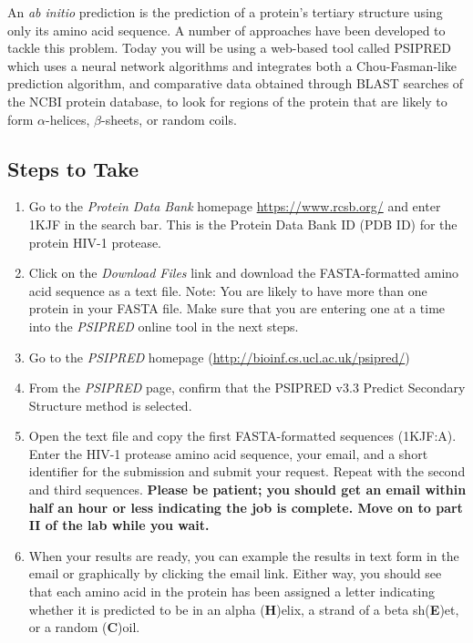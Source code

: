 An \emph{ab initio} prediction is the prediction of a protein's tertiary structure using only its amino acid sequence. A number of approaches have been developed to tackle this problem.  Today you will be using a web-based tool called PSIPRED which uses a neural network algorithms and integrates both a Chou-Fasman-like prediction algorithm, and comparative data obtained through BLAST searches of the NCBI protein database, to look for regions of the protein that are likely to form $\alpha$-helices, $\beta$-sheets, or random coils.

\subsection*{Steps to Take}

\begin{enumerate}

 \item Go to the \emph{Protein Data Bank} homepage \url{https://www.rcsb.org/} and enter \color{blue} 1KJF \color{black} in the search bar.  This is the Protein Data Bank ID (PDB ID) for the protein HIV-1 protease.

 \item Click on the \emph{Download Files} link and download the FASTA-formatted amino acid sequence as a text file. Note: You are likely to have more than one protein in your FASTA file. Make sure that you are entering one at a time into the \emph{PSIPRED} online tool in the next steps.

 \item Go to the \emph{PSIPRED} homepage (\url{http://bioinf.cs.ucl.ac.uk/psipred/})

 \item From the \emph{PSIPRED} page, confirm that the PSIPRED v3.3 Predict Secondary Structure method is selected. 

 \item Open the text file and copy the first FASTA-formatted sequences (1KJF:A). Enter the HIV-1 protease amino acid sequence, your email, and a short identifier for the submission and submit your request.  Repeat with the second and third sequences.  \textbf{Please be patient; you should get an email within half an hour or less indicating the job is complete.  Move on to part II of the lab while you wait.}

 \item When your results are ready, you can example the results in text form in the email or graphically by clicking the email link.  Either way, you should see that each amino acid in the protein has been assigned a letter indicating whether it is predicted to be in an alpha (\textbf{H})elix, a strand of a beta sh(\textbf{E})et, or a random (\textbf{C})oil.


\end{enumerate}
